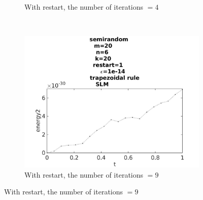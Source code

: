 \begin{figure}[H]
\begin{subfigure}[b]{0.3\textwidth}
                \caption{ With restart, the number of iterations $= 4$ }
                \label{fig:energytestrestart22}
        \end{subfigure}
        ~
        \begin{subfigure}[b]{0.3\textwidth}
                \includegraphics[width=\textwidth]{../MATLAB/fig/energytestrestart12.jpg}
                \caption{ With restart, the number of iterations $= 9$ }
                \label{fig:energytestrestart12}
        \end{subfigure}
        

\end{figure}
